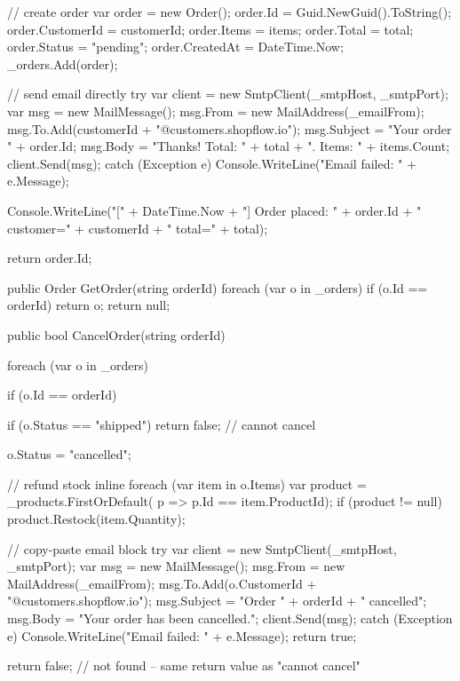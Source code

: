 \documentclass[11pt,a4paper]{article}
\begin{document}
\begin{codeframe}
\begin{codeblock}
{{        // create order
        var order        = new Order();
        order.Id         = Guid.NewGuid().ToString();
        order.CustomerId = customerId;
        order.Items      = items;
        order.Total      = total;
        order.Status     = "pending";
        order.CreatedAt  = DateTime.Now;
        _orders.Add(order);

        // send email directly
        try
        {
            var client  = new SmtpClient(_smtpHost, _smtpPort);
            var msg     = new MailMessage();
            msg.From    = new MailAddress(_emailFrom);
            msg.To.Add(customerId + "@customers.shopflow.io");
            msg.Subject = "Your order " + order.Id;
            msg.Body    = "Thanks! Total: " + total +
                          ". Items: " + items.Count;
            client.Send(msg);
        }
        catch (Exception e)
        {
            Console.WriteLine("Email failed: " + e.Message);
        }

        Console.WriteLine("[" + DateTime.Now + "] Order placed: "
            + order.Id + " customer=" + customerId + " total=" + total);

        return order.Id;
    }

    public Order GetOrder(string orderId)
    {
        foreach (var o in _orders)
            if (o.Id == orderId) return o;
        return null;
    }

    public bool CancelOrder(string orderId)
    {
        foreach (var o in _orders)
        {
            if (o.Id == orderId)
            {
                if (o.Status == "shipped")
                    return false;   // cannot cancel

                o.Status = "cancelled";

                // refund stock inline
                foreach (var item in o.Items)
                {
                    var product = _products.FirstOrDefault(
                        p => p.Id == item.ProductId);
                    if (product != null)
                        product.Restock(item.Quantity);
                }

                // copy-paste email block
                try
                {
                    var client  = new SmtpClient(_smtpHost, _smtpPort);
                    var msg     = new MailMessage();
                    msg.From    = new MailAddress(_emailFrom);
                    msg.To.Add(o.CustomerId + "@customers.shopflow.io");
                    msg.Subject = "Order " + orderId + " cancelled";
                    msg.Body    = "Your order has been cancelled.";
                    client.Send(msg);
                }
                catch (Exception e)
                {
                    Console.WriteLine("Email failed: " + e.Message);
                }
                return true;
            }
        }
        return false;   // not found -- same return value as "cannot cancel"
    }

}
\end{codeblock}
\end{codeframe}
\end{document}
